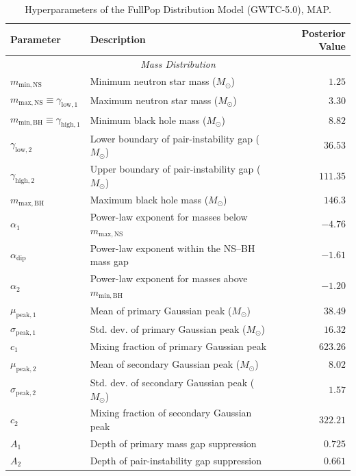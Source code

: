 \begin{table}[htb]
\renewcommand\arraystretch{1.08}
\setlength{\tabcolsep}{16pt}
\centering
\caption{Hyperparameters of the FullPop Distribution Model (GWTC-5.0), MAP.}
\label{tab:hyperparams}
\begin{tabular}{llr}
\toprule
\textbf{Parameter} & \textbf{Description} & \textbf{Posterior Value} \\
\midrule
\multicolumn{3}{c}{\textit{Mass Distribution}} \\
\midrule
$m_{\mathrm{min,NS}}$ & Minimum neutron star mass ($M_\odot$) & $1.25$ \\
$m_{\mathrm{max,NS}} \equiv \gamma_{\mathrm{low},1}$ & Maximum neutron star mass ($M_\odot$) & $3.30$ \\
$m_{\mathrm{min,BH}} \equiv \gamma_{\mathrm{high},1}$ & Minimum black hole mass ($M_\odot$) & $8.82$ \\
$\gamma_{\mathrm{low},2}$  & Lower boundary of pair-instability gap ($M_\odot$) & $36.53$ \\
$\gamma_{\mathrm{high},2}$ & Upper boundary of pair-instability gap ($M_\odot$) & $111.35$ \\
$m_{\mathrm{max,BH}}$ & Maximum black hole mass ($M_\odot$) & $146.3$ \\
\midrule
$\alpha_1$ & Power-law exponent for masses below $m_{\mathrm{max,NS}}$ & $-4.76$ \\
$\alpha_{\mathrm{dip}}$ & Power-law exponent within the NS–BH mass gap & $-1.61$ \\
$\alpha_2$ & Power-law exponent for masses above $m_{\mathrm{min,BH}}$ & $-1.20$ \\
\midrule
$\mu_{\mathrm{peak},1}$ & Mean of primary Gaussian peak ($M_\odot$) & $38.49$ \\
$\sigma_{\mathrm{peak},1}$ & Std. dev. of primary Gaussian peak ($M_\odot$) & $16.32$ \\
$c_1$ & Mixing fraction of primary Gaussian peak & $623.26$ \\
$\mu_{\mathrm{peak},2}$ & Mean of secondary Gaussian peak ($M_\odot$) & $8.02$ \\
$\sigma_{\mathrm{peak},2}$ & Std. dev. of secondary Gaussian peak ($M_\odot$) & $1.57$ \\
$c_2$ & Mixing fraction of secondary Gaussian peak & $322.21$ \\
\midrule
$A_1$ & Depth of primary mass gap suppression & $0.725$ \\
$A_2$ & Depth of pair-instability gap suppression & $0.661$ \\


\end{tabular}
\end{table}
